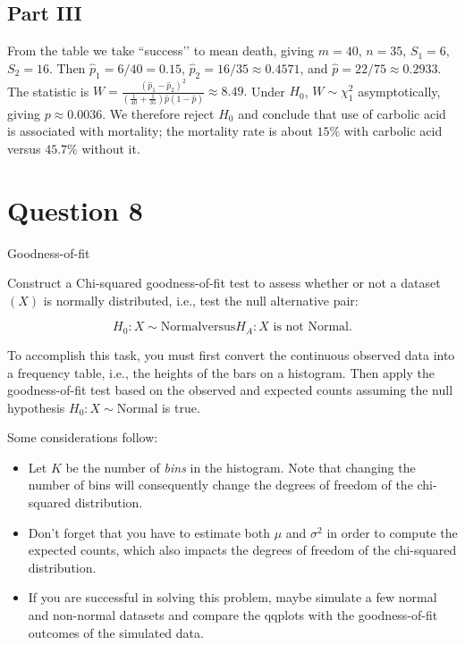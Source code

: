 \documentclass[letterpaper]{article}
\begin{document}
		\subsection{Part III}
		From the table we take “success’’ to mean death, giving
		$m=40$, $n=35$, $S_1=6$, $S_2=16$.
		Then $\hat p_1=6/40=0.15$, $\hat p_2=16/35\approx0.4571$, and
		$\hat p=22/75\approx0.2933$.
		The statistic is
		$
		W=\frac{(\hat p_1-\hat p_2)^2}
		{\left(\frac1{40}+\frac1{35}\right)\hat p(1-\hat p)}
		\approx 8.49.
		$
		Under $H_0$, $W\sim\chi^2_1$ asymptotically, giving
		$p\approx0.0036$.
		We therefore reject $H_0$ and conclude that use of carbolic acid is
		associated with mortality; the mortality rate is about $15\%$ with
		carbolic acid versus $45.7\%$ without it.
		
		
		\clearpage
		
		
		\section{Question 8}
		
		{\color{deepred} Goodness-of-fit}
		
		\medskip
		
		Construct a Chi-squared goodness-of-fit test to assess whether or not a dataset $(X)$ is normally distributed, i.e., test the null alternative pair:
		
		\[
		H_0 : X \sim \text{Normal}
		\text{versus} 
		H_A : X \text{ is not Normal}.
		\]
		
		To accomplish this task, you must first convert the continuous observed data into a frequency table, i.e., the heights of the bars on a histogram. 
		Then apply the goodness-of-fit test based on the observed and expected counts assuming the null hypothesis $H_0: X\sim\text{Normal}$ is true.
		
		Some considerations follow:
		
		\begin{itemize}
			
			\item Let $K$ be the number of \emph{bins} in the histogram. Note that changing the number of bins will consequently change the degrees of freedom of the chi-squared distribution.
			
			\item Don't forget that you have to estimate both $\mu$ and $\sigma^2$ in order to compute the expected counts, which also impacts the degrees of freedom of the chi-squared distribution.
			
			\item If you are successful in solving this problem, maybe simulate a few normal and non-normal datasets and compare the qqplots with the goodness-of-fit outcomes of the simulated data.
			
		\end{itemize}
		
\end{document}
